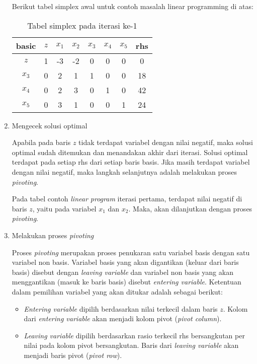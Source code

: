 \begin{enumerate}
		Berikut tabel simplex awal untuk contoh masalah linear programming di atas:
			
		\begin{table}[H]
			\centering
			\begin{tabular}{|c|c|c c c c c|c|}
				\hline
				basic & $z$ & $x_1$ & $x_2$ & $x_3$ & $x_4$ & $x_5$ & rhs \\
				\hline
				$z$ & 1 & -3 & -2 & 0 & 0 & 0 & 0 \\
				\hline
				$x_3$ & 0 & 2 & 1 & 1 & 0 & 0 & 18\\
				$x_4$ & 0 & 2 & 3 & 0 & 1 & 0 & 42\\
				$x_5$ & 0 & 3 & 1 & 0 & 0 & 1 & 24\\
				\hline
			\end{tabular}
			\caption{Tabel simplex pada iterasi ke-1}
		\end{table}

	\item Mengecek solusi optimal
	
    	Apabila pada baris $z$ tidak terdapat variabel dengan nilai negatif, maka solusi optimal sudah ditemukan dan menandakan akhir dari iterasi. Solusi optimal terdapat pada setiap rhs dari setiap baris basis. Jika masih terdapat variabel dengan nilai negatif, maka langkah selanjutnya adalah melakukan proses \textit{pivoting}.

		Pada tabel contoh \textit{linear program} iterasi pertama, terdapat nilai negatif di baris $z$, yaitu pada variabel $x_1$ dan $x_2$. Maka, akan dilanjutkan dengan proses \textit{pivoting}.

	\item Melakukan proses \textit{pivoting}
		
    	Proses \textit{pivoting} merupakan proses penukaran satu variabel basis dengan satu variabel non basis. Variabel basis yang akan digantikan (keluar dari baris basis) disebut dengan \textit{leaving variable} dan variabel non basis yang akan menggantikan (masuk ke baris basis) disebut \textit{entering variable}. Ketentuan dalam pemilihan variabel yang akan ditukar adalah sebagai berikut:

		\begin{itemize}
    		\item \textit{Entering variable} dipilih berdasarkan nilai terkecil dalam baris $z$. Kolom dari \textit{entering variable} akan menjadi kolom pivot (\textit{pivot column}).
    		
    		\item \textit{Leaving variable} dipilih berdasarkan rasio terkecil rhs bersangkutan per nilai pada kolom pivot bersangkutan. Baris dari \textit{leaving variable} akan menjadi baris pivot (\textit{pivot row}).


\end{itemize}
\end{enumerate}
